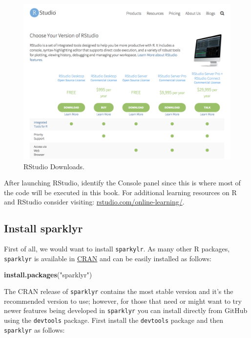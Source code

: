 \documentclass[]{book}
\newenvironment{Shaded}{\begin{snugshade}}{\end{snugshade}}
\newcommand{\KeywordTok}[1]{\textcolor[rgb]{0.13,0.29,0.53}{\textbf{#1}}}
\newcommand{\NormalTok}[1]{#1}
\newcommand{\StringTok}[1]{\textcolor[rgb]{0.31,0.60,0.02}{#1}}
\theoremstyle{definition}
\theoremstyle{definition}
\theoremstyle{definition}
\theoremstyle{remark}
\begin{document}
\begin{figure}

{\centering \includegraphics[width=13.78in]{images/02-getting-started-rstudio} 

}

\caption{RStudio Downloads.}\label{fig:rstudio-download}
\end{figure}

After launching RStudio, identify the Console panel since this is where
most of the code will be executed in this book. For additional learning
resources on R and RStudio consider visiting:
\href{https://www.rstudio.com/online-learning/}{rstudio.com/online-learning/}.

\hypertarget{install-sparklyr}{%
\subsection{Install sparklyr}\label{install-sparklyr}}

First of all, we would want to install \texttt{sparkylr}. As many other
R packages, \texttt{sparklyr} is available in
\href{https://CRAN.R-project.org/package=sparklyr}{CRAN} and can be
easily installed as follows:

\begin{Shaded}
\begin{Highlighting}[]
\KeywordTok{install.packages}\NormalTok{(}\StringTok{"sparklyr"}\NormalTok{)}
\end{Highlighting}
\end{Shaded}

The CRAN release of \texttt{sparklyr} contains the most stable version
and it's the recommended version to use; however, for those that need or
might want to try newer features being developed in \texttt{sparklyr}
you can install directly from GitHub using the \texttt{devtools}
package. First install the \texttt{devtools} package and then
\texttt{sparklyr} as follows:
\end{document}
